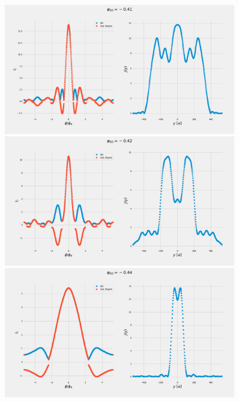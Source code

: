 \documentclass[a4paper]{article}
\begin{document}
\begin{figure}
	\includegraphics[width=0.9\textwidth]{figs/wg31double/current_and_density_041}
	\includegraphics[width=0.9\textwidth]{figs/wg31double/current_and_density_042}
	\includegraphics[width=0.9\textwidth]{figs/wg31double/current_and_density_044}
\end{figure}
\end{document}
